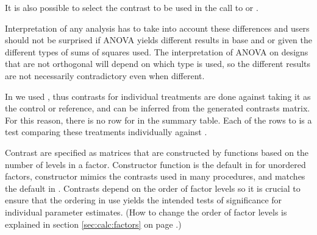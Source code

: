 \documentclass[krantz2]{krantz}\usepackage{knitr}
\begin{document}
It is also possible to select the contrast to be used in the call to  or .

\begin{knitrout}\footnotesize
{}\color{fgcolor}\begin{kframe}
\begin{alltt}
 \hlkwb{<-}  \hlopt{~}   
               \hlstd{=} \hlstd{(} 
  \hlkwb{<-}  \hlopt{~}   
               \hlstd{=} \hlstd{(} 
\end{alltt}
\end{kframe}
\end{knitrout}

Interpretation of any analysis has to take into account these differences and users should not be surprised if ANOVA yields different results in base \Rlang and  or  given the different types of sums of squares used. The interpretation of ANOVA on designs that are not orthogonal will depend on which type is used, so the different results are not necessarily contradictory even when different.

In  we used , thus contrasts for individual treatments are done against  taking it as the control or reference, and can be inferred from the generated contrasts matrix. For this reason, there is no row for  in the summary table. Each of the rows  to  is a test comparing these treatments individually against .

\begin{warningbox}
  Contrast are specified as matrices that are constructed by functions based on the number of levels in a factor. Constructor function  is the default in \Rlang for unordered factors, constructor  mimics the contrasts used in many  procedures, and  matches the default in . Contrasts depend on the order of factor levels so it is crucial to ensure that the ordering in use yields the intended tests of significance for individual parameter estimates. (How to change the order of factor levels is explained in section \ref{sec:calc:factors} on page \pageref{sec:calc:factors}.)
\end{warningbox}
\end{document}
